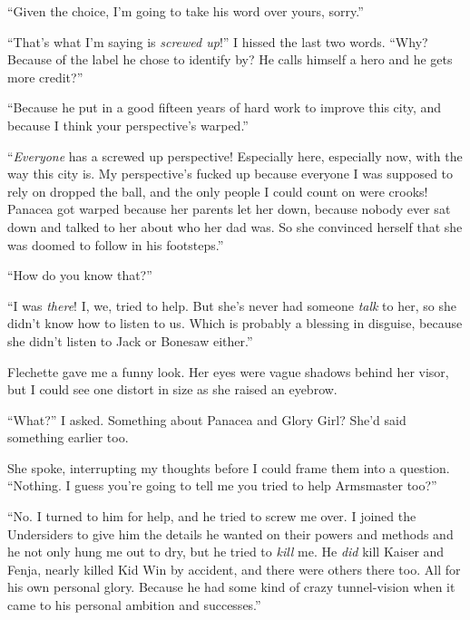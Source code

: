 ``Given the choice, I'm going to take his word over yours, sorry.''



``That's what I'm saying is \emph{screwed up}!''  I hissed the last two words.  ``Why?  Because of the label he chose to identify by?  He calls himself a hero and he gets more credit?''



``Because he put in a good fifteen years of hard work to improve this city, and because I think your perspective's warped.''



``\emph{Everyone} has a screwed up perspective!  Especially here, especially now, with the way this city is.  My perspective's fucked up because everyone I was supposed to rely on dropped the ball, and the only people I could count on were crooks!  Panacea got warped because her parents let her down, because nobody ever sat down and talked to her about who her dad was.  So she convinced herself that she was doomed to follow in his footsteps.''



``How do you know that?''



``I was \emph{there}!  I, we, tried to help.  But she's never had someone \emph{talk} to her, so she didn't know how to listen to us.  Which is probably a blessing in disguise, because she didn't listen to Jack or Bonesaw either.''



Flechette gave me a funny look.  Her eyes were vague shadows behind her visor, but I could see one distort in size as she raised an eyebrow.



``What?''  I asked.  Something about Panacea and Glory Girl?  She'd said something earlier too.



She spoke, interrupting my thoughts before I could frame them into a question.  ``Nothing.  I guess you're going to tell me you tried to help Armsmaster too?''



``No.  I turned to him for help, and he tried to screw me over.  I joined the Undersiders to give him the details he wanted on their powers and methods and he not only hung me out to dry, but he tried to \emph{kill} me.  He \emph{did} kill Kaiser and Fenja, nearly killed Kid Win by accident, and there were others there too.  All for his own personal glory.  Because he had some kind of crazy tunnel-vision when it came to his personal ambition and successes.''



